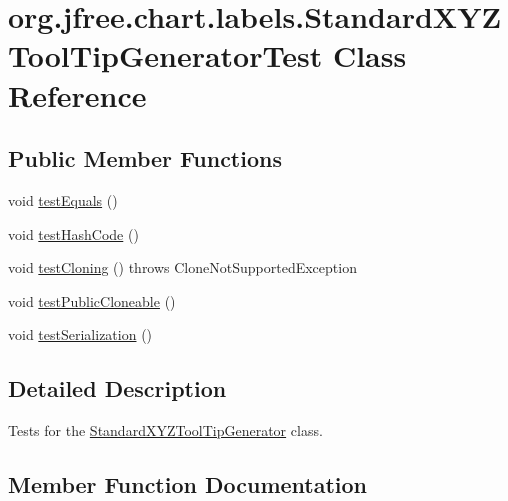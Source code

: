 \hypertarget{classorg_1_1jfree_1_1chart_1_1labels_1_1_standard_x_y_z_tool_tip_generator_test}{}\section{org.\+jfree.\+chart.\+labels.\+Standard\+X\+Y\+Z\+Tool\+Tip\+Generator\+Test Class Reference}
\label{classorg_1_1jfree_1_1chart_1_1labels_1_1_standard_x_y_z_tool_tip_generator_test}
\subsection*{Public Member Functions}
\begin{DoxyCompactItemize}
\item 
void \mbox{\hyperlink{classorg_1_1jfree_1_1chart_1_1labels_1_1_standard_x_y_z_tool_tip_generator_test_ab5db7b34c142d75d33c52d8ed5125155}{test\+Equals}} ()
\item 
void \mbox{\hyperlink{classorg_1_1jfree_1_1chart_1_1labels_1_1_standard_x_y_z_tool_tip_generator_test_a920b7fc8379e190c4af4509851776caf}{test\+Hash\+Code}} ()
\item 
void \mbox{\hyperlink{classorg_1_1jfree_1_1chart_1_1labels_1_1_standard_x_y_z_tool_tip_generator_test_adb69d8d8c575df194863fea353629142}{test\+Cloning}} ()  throws Clone\+Not\+Supported\+Exception 
\item 
void \mbox{\hyperlink{classorg_1_1jfree_1_1chart_1_1labels_1_1_standard_x_y_z_tool_tip_generator_test_a23d101f60aeca4d2a110f83c26e761a4}{test\+Public\+Cloneable}} ()
\item 
void \mbox{\hyperlink{classorg_1_1jfree_1_1chart_1_1labels_1_1_standard_x_y_z_tool_tip_generator_test_a966195f0a1a91390dabc4cfd5b8adb1d}{test\+Serialization}} ()
\end{DoxyCompactItemize}


\subsection{Detailed Description}
Tests for the \mbox{\hyperlink{classorg_1_1jfree_1_1chart_1_1labels_1_1_standard_x_y_z_tool_tip_generator}{Standard\+X\+Y\+Z\+Tool\+Tip\+Generator}} class. 

\subsection{Member Function Documentation}
\mbox{\label{classorg_1_1jfree_1_1chart_1_1labels_1_1_standard_x_y_z_tool_tip_generator_test_adb69d8d8c575df194863fea353629142}} 
